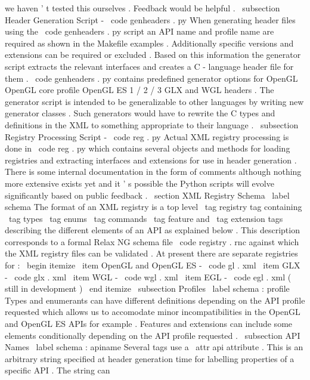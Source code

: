 we
haven
'
t
tested
this
ourselves
.
Feedback
would
be
helpful
.
\
subsection
{
Header
Generation
Script
-
\
code
{
genheaders
.
py
}
}
When
generating
header
files
using
the
\
code
{
genheaders
.
py
}
script
an
API
name
and
profile
name
are
required
as
shown
in
the
Makefile
examples
.
Additionally
specific
versions
and
extensions
can
be
required
or
excluded
.
Based
on
this
information
the
generator
script
extracts
the
relevant
interfaces
and
creates
a
C
-
language
header
file
for
them
.
\
code
{
genheaders
.
py
}
contains
predefined
generator
options
for
OpenGL
OpenGL
core
profile
OpenGL
ES
1
/
2
/
3
GLX
and
WGL
headers
.
The
generator
script
is
intended
to
be
generalizable
to
other
languages
by
writing
new
generator
classes
.
Such
generators
would
have
to
rewrite
the
C
types
and
definitions
in
the
XML
to
something
appropriate
to
their
language
.
\
subsection
{
Registry
Processing
Script
-
\
code
{
reg
.
py
}
}
Actual
XML
registry
processing
is
done
in
\
code
{
reg
.
py
}
which
contains
several
objects
and
methods
for
loading
registries
and
extracting
interfaces
and
extensions
for
use
in
header
generation
.
There
is
some
internal
documentation
in
the
form
of
comments
although
nothing
more
extensive
exists
yet
and
it
'
s
possible
the
Python
scripts
will
evolve
significantly
based
on
public
feedback
.
\
section
{
XML
Registry
Schema
}
\
label
{
schema
}
The
format
of
an
XML
registry
is
a
top
level
\
tag
{
registry
}
tag
containing
\
tag
{
types
}
\
tag
{
enums
}
\
tag
{
commands
}
\
tag
{
feature
}
and
\
tag
{
extension
}
tags
describing
the
different
elements
of
an
API
as
explained
below
.
This
description
corresponds
to
a
formal
Relax
NG
schema
file
\
code
{
registry
.
rnc
}
against
which
the
XML
registry
files
can
be
validated
.
At
present
there
are
separate
registries
for
:
\
begin
{
itemize
}
\
item
OpenGL
and
OpenGL
ES
-
\
code
{
gl
.
xml
}
\
item
GLX
-
\
code
{
glx
.
xml
}
\
item
WGL
-
\
code
{
wgl
.
xml
}
\
item
EGL
-
\
code
{
egl
.
xml
}
(
still
in
development
)
\
end
{
itemize
}
\
subsection
{
Profiles
}
\
label
{
schema
:
profile
}
Types
and
enumerants
can
have
different
definitions
depending
on
the
API
profile
requested
which
allows
us
to
accomodate
minor
incompatibilities
in
the
OpenGL
and
OpenGL
ES
APIs
for
example
.
Features
and
extensions
can
include
some
elements
conditionally
depending
on
the
API
profile
requested
.
\
subsection
{
API
Names
}
\
label
{
schema
:
apiname
}
Several
tags
use
a
\
attr
{
api
}
attribute
.
This
is
an
arbitrary
string
specified
at
header
generation
time
for
labelling
properties
of
a
specific
API
.
The
string
can
